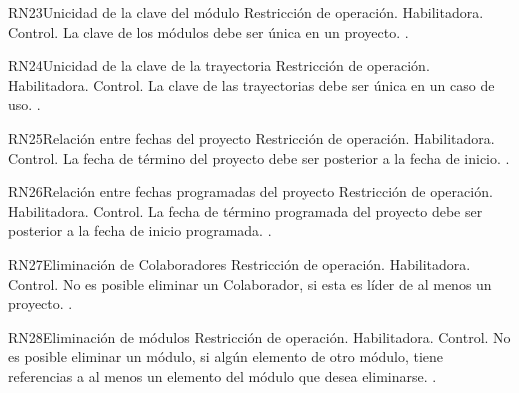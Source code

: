 \begin{BussinesRule}{RN23}{Unicidad de la clave del módulo} 
	\BRitem[Tipo:] Restricción de operación. 
	\BRitem[Clase:] Habilitadora. 
	\BRitem[Nivel:] Control. %
	\BRitem[Descripción:] La clave de los módulos debe ser única en un proyecto.
	 . 
\end{BussinesRule}

\begin{BussinesRule}{RN24}{Unicidad de la clave de la trayectoria} 
	\BRitem[Tipo:] Restricción de operación. 
	\BRitem[Clase:] Habilitadora. 
	\BRitem[Nivel:] Control. %
	\BRitem[Descripción:] La clave de las trayectorias debe ser única en un caso de uso.
	 \UCref{}{}. 
\end{BussinesRule}

\begin{BussinesRule}{RN25}{Relación entre fechas del proyecto} 
	\BRitem[Tipo:] Restricción de operación. 
	\BRitem[Clase:] Habilitadora. 
	\BRitem[Nivel:] Control. %
	\BRitem[Descripción:] La fecha de término del proyecto debe ser posterior a la fecha de inicio.
	 \UCref{}{}. 
\end{BussinesRule}

\begin{BussinesRule}{RN26}{Relación entre fechas programadas del proyecto} 
	\BRitem[Tipo:] Restricción de operación. 
	\BRitem[Clase:] Habilitadora. 
	\BRitem[Nivel:] Control. %
	\BRitem[Descripción:] La fecha de término programada del proyecto debe ser posterior a la fecha de inicio programada.
	 \UCref{}{}. 
\end{BussinesRule}

\begin{BussinesRule}{RN27}{Eliminación de Colaboradores} 
	\BRitem[Tipo:] Restricción de operación. 
	\BRitem[Clase:] Habilitadora. 
	\BRitem[Nivel:] Control. %
	\BRitem[Descripción:] No es posible eliminar un Colaborador, si esta es líder de al menos un proyecto.
	 . 
\end{BussinesRule}

\begin{BussinesRule}{RN28}{Eliminación de módulos} 
	\BRitem[Tipo:] Restricción de operación. 
	\BRitem[Clase:] Habilitadora. 
	\BRitem[Nivel:] Control. %
	\BRitem[Descripción:] No es posible eliminar un módulo, si algún elemento de otro módulo, tiene referencias a al menos un elemento del módulo que desea eliminarse.
	 . 
\end{BussinesRule}

